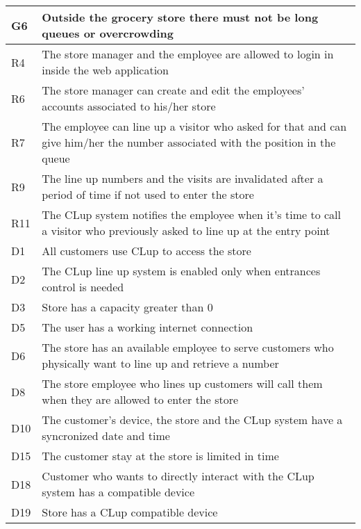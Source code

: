 \begin{center}
        {\renewcommand{\arraystretch}{1.5}
        \begin{longtable}{L{2cm}L{12cm}}
            \hline
            \textbf{G6} & \textbf{Outside the grocery store there must not be long queues or overcrowding} \\
            \hline
             R4 & The store manager and the employee are allowed to login in inside the web application \\
            \hline
             R6 & The store manager can create and edit the employees’ accounts associated to his/her store \\
            \hline
             R7 & The employee can line up a visitor who asked for that and can give him/her the number associated with the position in the queue \\
            \hline
             R9 & The line up numbers and the visits are invalidated after a period of time if not used to enter the store \\
            \hline
             R11 & The CLup system notifies the employee when it’s time to call a visitor who previously asked to line up at the entry point \\
            \hline
             D1 & All customers use CLup to access the store \\
            \hline
             D2 & The CLup line up system is enabled only when entrances control is needed \\
            \hline
             D3 & Store has a capacity greater than 0 \\
            \hline
             D5 & The user has a working internet connection \\
            \hline
             D6 & The store has an available employee to serve customers who physically want to line up and retrieve a number \\
            \hline
             D8 & The store employee who lines up customers will call them when they are allowed to enter the store \\
            \hline
             D10 & The customer’s device, the store and the CLup system have a syncronized date and time \\
            \hline
             D15 & The customer stay at the store is limited in time \\
            \hline
             D18 & Customer who wants to directly interact with the CLup system has a compatible device \\
            \hline
             D19 & Store has a CLup compatible device \\
            \hline
        \end{longtable}}


\end{center}
